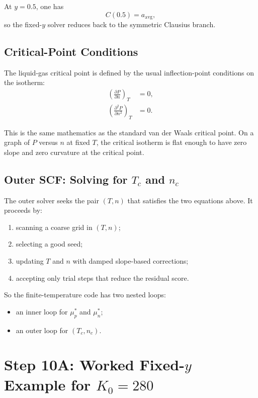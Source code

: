 \documentclass[11pt]{article}
\begin{document}
At $y=0.5$, one has
\begin{equation}
C(0.5)=a_{\mathrm{avg}},
\end{equation}
so the fixed-$y$ solver reduces back to the symmetric Clausius branch.

\subsection{Critical-Point Conditions}

The liquid-gas critical point is defined by the usual inflection-point
conditions on the isotherm:
\begin{align}
\left(\frac{\partial P}{\partial n}\right)_T &= 0, \\
\left(\frac{\partial^2 P}{\partial n^2}\right)_T &= 0.
\end{align}

This is the same mathematics as the standard van der Waals critical point. On
a graph of $P$ versus $n$ at fixed $T$, the critical isotherm is flat enough to
have zero slope and zero curvature at the critical point.

\subsection{Outer SCF: Solving for \texorpdfstring{$T_c$}{Tc} and \texorpdfstring{$n_c$}{nc}}

The outer solver seeks the pair $(T,n)$ that satisfies the two equations above.
It proceeds by:
\begin{enumerate}
\item scanning a coarse grid in $(T,n)$;
\item selecting a good seed;
\item updating $T$ and $n$ with damped slope-based corrections;
\item accepting only trial steps that reduce the residual score.
\end{enumerate}

So the finite-temperature code has two nested loops:
\begin{itemize}
\item an inner loop for $\mu_p^\ast$ and $\mu_n^\ast$;
\item an outer loop for $(T_c,n_c)$.
\end{itemize}

\section{Step 10A: Worked Fixed-\texorpdfstring{$y$}{y} Example for \texorpdfstring{$K_0=280$}{K0=280}}
\end{document}

